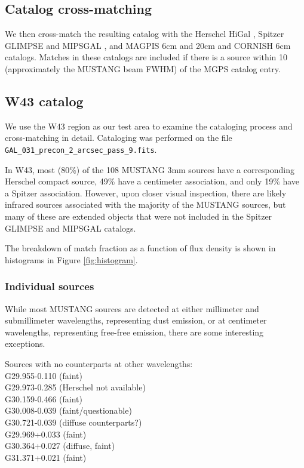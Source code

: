 \documentclass[twocolumn]{aastex62}
\begin{document}
\subsection{Catalog cross-matching}
\label{sec:catalogmatching}
We then cross-match the resulting catalog with the Herschel HiGal
\citep{Elia2017a}, Spitzer GLIMPSE and MIPSGAL
\citep{Churchwell2009a,Gutermuth2015a}, and MAGPIS 6cm and 20cm
\citep{Giveon2005a,Hoare2006a} and CORNISH 6cm \citep{Hoare2012a} catalogs.
Matches in these catalogs are included if there is a source within 10\arcsec
(approximately the MUSTANG beam FWHM) of the MGPS catalog entry.

\subsection{W43 catalog}
We use the W43 region as our test area to examine the cataloging process and
cross-matching in detail.  Cataloging was performed on the file
\texttt{GAL\_031\_precon\_2\_arcsec\_pass\_9.fits}.

In W43, most (80\%) of the 108 MUSTANG 3mm sources have a corresponding Herschel
compact source, 49\% have a centimeter association, and only 19\% have a
Spitzer association.  However, upon closer visual inspection, there are likely
infrared sources associated with the majority of the MUSTANG sources, but many
of these are extended objects that were not included in the Spitzer GLIMPSE and
MIPSGAL catalogs.

The breakdown of match fraction as a function of flux density is shown in histograms
in Figure \ref{fig:histogram}.

\subsubsection{Individual sources}
While most MUSTANG sources are detected at either millimeter and submillimeter
wavelengths, representing dust emission, or at centimeter wavelengths,
representing free-free emission, there are some interesting exceptions.

Sources with no counterparts at other wavelengths: \\
G29.955-0.110 (faint) \\
G29.973-0.285 (Herschel not available) \\
G30.159-0.466 (faint) \\
G30.008-0.039 (faint/questionable) \\
G30.721-0.039 (diffuse counterparts?) \\
G29.969+0.033 (faint) \\
G30.364+0.027 (diffuse, faint)\\
G31.371+0.021 (faint) \\
\end{document}
